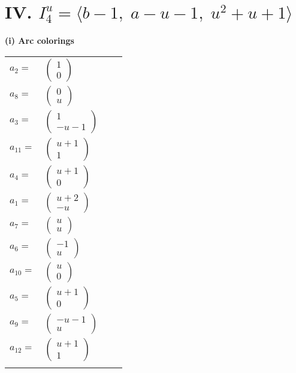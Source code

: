 \documentclass[1p]{elsarticle_modified}
\theoremstyle{definition}
\begin{document}
\centering \section*{IV. $I^u_{4}= \langle b-1,\;a- u-1,\;u^2+u+1 \rangle$}
\flushleft \textbf{(i) Arc colorings}\\
\begin{tabular}{m{7pt} m{180pt} m{7pt} m{180pt} }
\flushright $a_{2}=$&$\begin{pmatrix}1\\0\end{pmatrix}$ \\
\flushright $a_{8}=$&$\begin{pmatrix}0\\u\end{pmatrix}$ \\
\flushright $a_{3}=$&$\begin{pmatrix}1\\- u-1\end{pmatrix}$ \\
\flushright $a_{11}=$&$\begin{pmatrix}u+1\\1\end{pmatrix}$ \\
\flushright $a_{4}=$&$\begin{pmatrix}u+1\\0\end{pmatrix}$ \\
\flushright $a_{1}=$&$\begin{pmatrix}u+2\\- u\end{pmatrix}$ \\
\flushright $a_{7}=$&$\begin{pmatrix}u\\u\end{pmatrix}$ \\
\flushright $a_{6}=$&$\begin{pmatrix}-1\\u\end{pmatrix}$ \\
\flushright $a_{10}=$&$\begin{pmatrix}u\\0\end{pmatrix}$ \\
\flushright $a_{5}=$&$\begin{pmatrix}u+1\\0\end{pmatrix}$ \\
\flushright $a_{9}=$&$\begin{pmatrix}- u-1\\u\end{pmatrix}$ \\
\flushright $a_{12}=$&$\begin{pmatrix}u+1\\1\end{pmatrix}$\\&\end{tabular}
\end{document}
